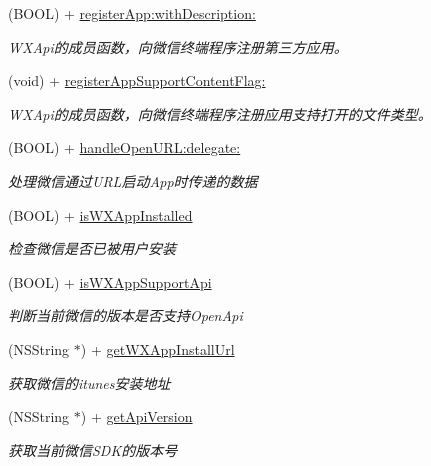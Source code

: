 \begin{DoxyCompactItemize}
(B\+O\+OL) + \mbox{\hyperlink{interface_w_x_api_a76af46b7bb7e49aef40476a0dc377472}{register\+App\+:with\+Description\+:}}
\begin{DoxyCompactList}\small\item\em W\+X\+Api的成员函数，向微信终端程序注册第三方应用。 \end{DoxyCompactList}\item 
(void) + \mbox{\hyperlink{interface_w_x_api_a3a8dd85dbe67ae84d4c75d674d781c9b}{register\+App\+Support\+Content\+Flag\+:}}
\begin{DoxyCompactList}\small\item\em W\+X\+Api的成员函数，向微信终端程序注册应用支持打开的文件类型。 \end{DoxyCompactList}\item 
(B\+O\+OL) + \mbox{\hyperlink{interface_w_x_api_aab36d7c09414d7bc3d7ca200b48f2f9c}{handle\+Open\+U\+R\+L\+:delegate\+:}}
\begin{DoxyCompactList}\small\item\em 处理微信通过\+U\+R\+L启动\+App时传递的数据 \end{DoxyCompactList}\item 
(B\+O\+OL) + \mbox{\hyperlink{interface_w_x_api_a3684676bea249fdd0708a38ee74f0604}{is\+W\+X\+App\+Installed}}
\begin{DoxyCompactList}\small\item\em 检查微信是否已被用户安装 \end{DoxyCompactList}\item 
(B\+O\+OL) + \mbox{\hyperlink{interface_w_x_api_a1ae34dd86ae2c2f553dd6981a35397ee}{is\+W\+X\+App\+Support\+Api}}
\begin{DoxyCompactList}\small\item\em 判断当前微信的版本是否支持\+Open\+Api \end{DoxyCompactList}\item 
(N\+S\+String $\ast$) + \mbox{\hyperlink{interface_w_x_api_a5e8a0217bef24a40c7d2edd9b3c5cdb9}{get\+W\+X\+App\+Install\+Url}}
\begin{DoxyCompactList}\small\item\em 获取微信的itunes安装地址 \end{DoxyCompactList}\item 
(N\+S\+String $\ast$) + \mbox{\hyperlink{interface_w_x_api_a5995d42d92822722f7ebf11663db2d33}{get\+Api\+Version}}
\begin{DoxyCompactList}\small\item\em 获取当前微信\+S\+D\+K的版本号 \end{DoxyCompactList}\item 

\end{DoxyCompactItemize}
